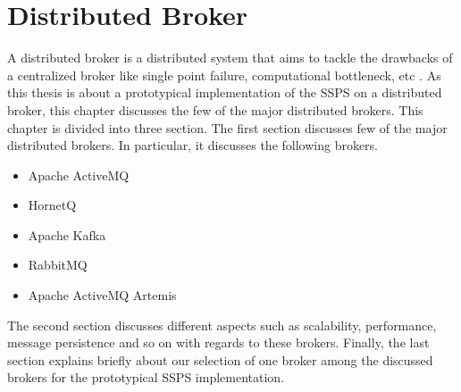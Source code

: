 \chapter{Distributed Broker}\label{chapter:distributed_broker}

A distributed broker is a distributed system that aims to tackle the drawbacks of a centralized broker like single point failure, computational bottleneck, etc \parencite{distributed_broker}. As this thesis is about a prototypical implementation of the SSPS on a distributed broker, this chapter discusses the few of the major distributed brokers. This chapter is divided into three section. The first section discusses few of the major distributed brokers. In particular, it discusses the following brokers.

\begin{itemize}
  \item Apache ActiveMQ
  \item HornetQ
  \item Apache Kafka
  \item RabbitMQ
  \item Apache ActiveMQ Artemis
\end{itemize}

The second section discusses different aspects such as scalability, performance, message persistence and so on with regards to these brokers. Finally, the last section explains briefly about our selection of one broker among the discussed brokers for the prototypical SSPS implementation.